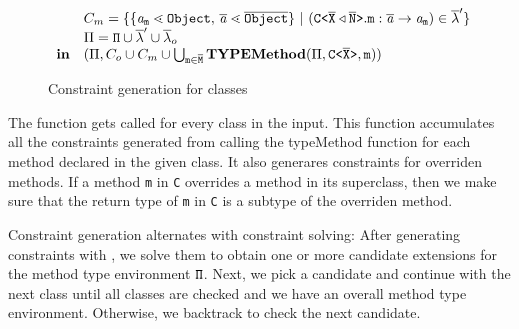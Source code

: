 \documentclass[a4paper,USenglish,cleveref, autoref, thm-restate, anonymous]{lipics-v2021}
\begin{document}
\begin{figure}[tp]
\begin{gather*}
\begin{array}{@{}l@{}l}
\begin{array}{ll@{}l}
                               & \consSet_m = \set{ \set{\tv{a}_{\mv m} \lessdot \type{Object}, \, \ol{\tv{a}} \lessdot \ol{\type{Object}}}
                                \ |\ (\exptype{C}{\ol{X} \triangleleft \ol{N}}.\mv{m} : \ol{\tv{a}} \to \tv{a}_{\mv m}) \in \ol{\methodAssumption}'} \\
                               & \Pi = \mv{\Pi} \cup
                                 \ol{\methodAssumption}' \cup
                                 \ol{\methodAssumption}_o \\
                  \textbf{in} 
                               & { ( \Pi, 
                                 \consSet_o \cup \consSet_m \cup
                                 \bigcup_{\texttt{m} \in \ol{M}}
                                 \typeMethod(\Pi, \exptype{C}{\ol{X}},  \mathtt{m}))
                                 } 
                \end{array}
    \end{array}
  \end{gather*}
  \caption{Constraint generation for classes}
  \label{fig:constraints-for-classes}
\end{figure}


The \fjtype function gets called for every class in the input.
This function accumulates all the constraints generated from calling the
typeMethod function for each method declared in the given class.
It also generares constraints for overriden methods.
If a method \texttt{m} in \texttt{C} overrides a method in its superclass,
then we make sure that the return type of \texttt{m} in \texttt{C} is
a subtype of the overriden method.
\fi

Constraint generation alternates with constraint solving: After
generating constraints with {\fjtype}, we solve them to obtain one or
more candidate extensions for the method type environment
${\tt \Pi}$. Next, we pick a candidate and continue with the next class
until all classes are checked and we have an overall method type
environment.  Otherwise, we backtrack to check the next candidate. 
\end{document}
